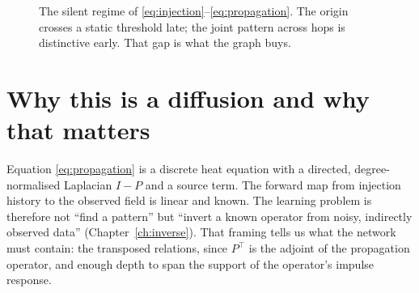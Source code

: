 \begin{figure}[h]
\centering
{}
\caption{The silent regime of \eqref{eq:injection}--\eqref{eq:propagation}. The origin crosses a
static threshold late; the joint pattern across hops is distinctive early. That gap is what the
graph buys.}
\end{figure}

\section{Why this is a diffusion and why that matters}
Equation \eqref{eq:propagation} is a discrete heat equation with a directed, degree-normalised
Laplacian $I-P$ and a source term. The forward map from injection history to the observed field is
linear and known. The learning problem is therefore not ``find a pattern'' but ``invert a known
operator from noisy, indirectly observed data'' (Chapter~\ref{ch:inverse}). That framing tells us
what the network must contain: the transposed relations, since $P^\top$ is the adjoint of the
propagation operator, and enough depth to span the support of the operator's impulse response.
